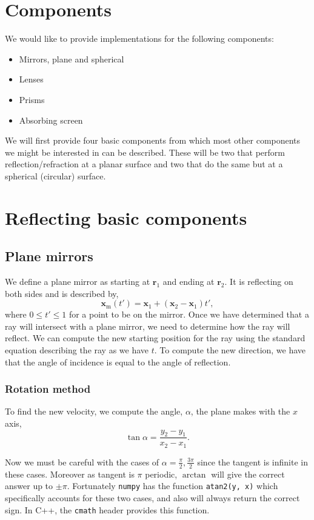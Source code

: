 \documentclass{article}
\let\vec \bm
\begin{document}
\section{Components}
We would like to provide implementations for the following components:
\begin{itemize}
    \item Mirrors, plane and spherical
    \item Lenses
    \item Prisms
    \item Absorbing screen
\end{itemize}
We will first provide four basic components from which most other components we might be interested in can be described. These will be two that perform reflection/refraction at a planar surface and two that do the same but at a spherical (circular) surface.

\section{Reflecting basic components}
\subsection{Plane mirrors}
We define a plane mirror as starting at $\vec{r}_1$ and ending at $\vec{r}_2$. It is reflecting on both sides and is described by,
\begin{equation}
    \vec{x}_\mathrm{m}(t')
    =
    \vec{x}_1 + (\vec{x}_2 - \vec{x}_1) t',
\end{equation}
where $0 \le t' \le 1$ for a point to be on the mirror. Once we have determined that a ray will intersect with a plane mirror, we need to determine how the ray will reflect. We can compute the new starting position for the ray using the standard equation describing the ray as we have $t$. To compute the new direction, we have that the angle of incidence is equal to the angle of reflection.

\subsubsection{Rotation method}
To find the new velocity, we compute the angle, $\alpha$, the plane makes with the $x$ axis,
\begin{equation}
    \label{eq:plane_angle}
    \tan \alpha
    =
    \frac{y_2 - y_1}{x_2 - x_1}.
\end{equation}

Now we must be careful with the cases of $\alpha = \frac{\pi}{2}, \frac{3\pi}{2}$ since the tangent is infinite in these cases. Moreover as tangent is $\pi$ periodic, $\arctan$ will give the correct answer up to $\pm \pi$. Fortunately \texttt{numpy} has the function \texttt{atan2(y, x)} which specifically accounts for these two cases, and also will always return the correct sign. In C++, the \texttt{cmath} header provides this function.
\end{document}
